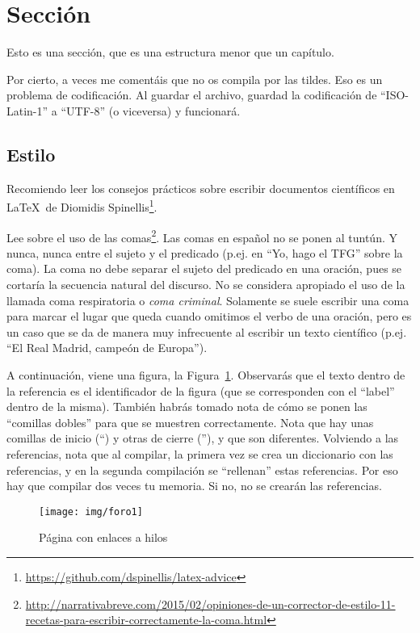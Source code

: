 \documentclass[a4paper, 12pt]{book}
\begin{document}
\section{Sección}
\label{sec:seccion}

Esto es una sección, que es una estructura menor que un capítulo. 

Por cierto, a veces me comentáis que no os compila por las tildes.
Eso es un problema de codificación.
Al guardar el archivo, guardad la codificación de ``ISO-Latin-1'' a ``UTF-8'' (o viceversa) y funcionará.

\subsection{Estilo}
\label{subsec:estilo}

Recomiendo leer los consejos prácticos sobre escribir documentos científicos en \LaTeX \ de Diomidis Spinellis\footnote{\url{https://github.com/dspinellis/latex-advice}}.

Lee sobre el uso de las comas\footnote{\url{http://narrativabreve.com/2015/02/opiniones-de-un-corrector-de-estilo-11-recetas-para-escribir-correctamente-la-coma.html}}. 
Las comas en español no se ponen al tuntún.
Y nunca, nunca entre el sujeto y el predicado (p.ej. en ``Yo, hago el TFG'' sobre la coma).
La coma no debe separar el sujeto del predicado en una oración, pues se cortaría la secuencia natural del discurso.
No se considera apropiado el uso de la llamada coma respiratoria o \emph{coma criminal}.
Solamente se suele escribir una coma para marcar el lugar que queda cuando omitimos el verbo de una oración, pero es un caso que se da de manera muy infrecuente al escribir un texto científico (p.ej. ``El Real Madrid, campeón de Europa'').

A continuación, viene una figura, la Figura~\ref{figura:foro_hilos}. 
Observarás que el texto dentro de la referencia es el identificador de la figura (que se corresponden con el ``label'' dentro de la misma). 
También habrás tomado nota de cómo se ponen las ``comillas dobles'' para que se muestren correctamente. 
Nota que hay unas comillas de inicio (``) y otras de cierre (''), y que son diferentes.
Volviendo a las referencias, nota que al compilar, la primera vez se crea un diccionario con las referencias, y en la segunda compilación se ``rellenan'' estas referencias. 
Por eso hay que compilar dos veces tu memoria.
Si no, no se crearán las referencias.

 \begin{figure}
    \centering
    \texttt{[image: img/foro1]}
    \caption{Página con enlaces a hilos}
    \label{figura:foro_hilos}
 \end{figure}
\end{document}
